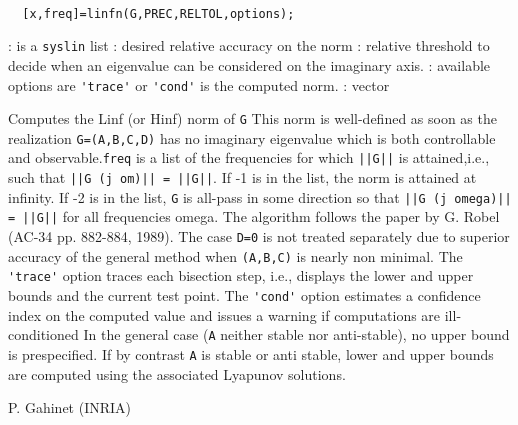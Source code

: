 \begin{mandesc}
   \\ %
\end{mandesc}
\begin{calling_sequence}
\begin{verbatim}
  [x,freq]=linfn(G,PREC,RELTOL,options);  
\end{verbatim}
\end{calling_sequence}
\begin{parameters}
  \begin{varlist}
    : is a \verb!syslin! list
    : desired relative accuracy on the norm
    : relative threshold to decide when an eigenvalue can be  considered on the imaginary axis.
    : available options are \verb!'trace'! or \verb!'cond'!
     is the computed norm.
    : vector
  \end{varlist}
\end{parameters}
\begin{mandescription}
  Computes the Linf (or Hinf) norm of \verb!G!
  This norm is well-defined as soon as the realization
  \verb!G=(A,B,C,D)! has no imaginary eigenvalue which is both 
  controllable and observable.\verb!freq! is a list of the frequencies for which \verb!||G||! is 
  attained,i.e., such that \verb!||G (j om)|| = ||G||!.
  If -1 is in the list, the norm is attained at infinity.
  If -2 is in the list, \verb!G! is all-pass in some direction so that 
  \verb!||G (j omega)|| = ||G||! for all frequencies omega.
  The algorithm follows the paper by G. Robel 
  (AC-34 pp. 882-884, 1989).
  The case \verb!D=0! is not treated separately due to superior 
  accuracy of the general method when \verb!(A,B,C)! is nearly 
  non minimal.
  The \verb!'trace'! option traces each bisection step, i.e., displays 
  the lower and upper bounds and the current test point.
  The \verb!'cond'! option estimates a confidence index on the computed 
  value and issues a warning if computations are 
  ill-conditioned
  In the general case (\verb!A! neither stable nor anti-stable), 
  no upper bound is  prespecified.
  If by contrast \verb!A! is stable or anti stable, lower
  and upper bounds are computed using the associated 
  Lyapunov solutions.
\end{mandescription}
\begin{manseealso}
\end{manseealso}
\begin{authors}
  P. Gahinet (INRIA)
\end{authors}
